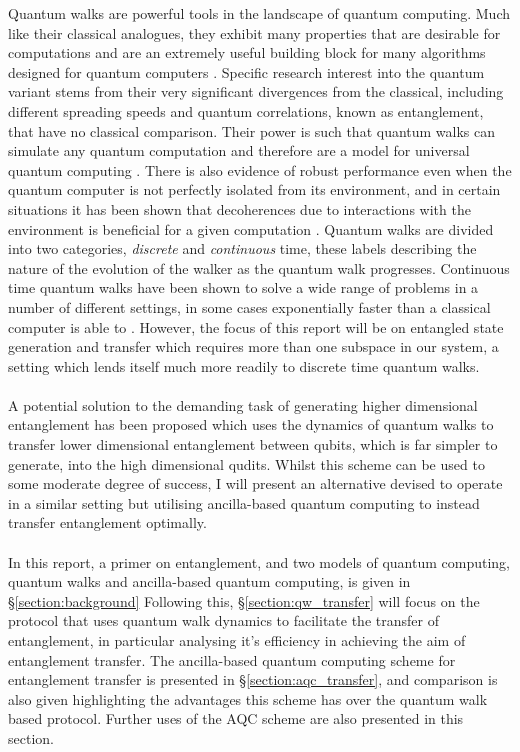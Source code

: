 Quantum walks are powerful tools in the landscape of quantum computing. 
Much like their classical analogues, they exhibit many properties that are desirable for computations and are an extremely useful building block for many algorithms designed for quantum computers \cite{shenvi2003}. 
Specific research interest into the quantum variant stems from their very significant divergences from the classical, including different spreading speeds and quantum correlations, known as entanglement, that have no classical comparison. 
Their power is such that quantum walks can simulate any quantum computation and therefore are a model for universal quantum computing \cite{Childs_2009}.
There is also evidence of robust performance even when the quantum computer is not perfectly isolated from its environment, and in certain situations it has been shown that decoherences due to interactions with the environment is beneficial for a given computation \cite{KENDON_2007}. 
Quantum walks are divided into two categories, \emph{discrete} and \emph{continuous} time, these labels describing the nature of the evolution of the walker as the quantum walk progresses.
Continuous time quantum walks have been shown to solve a wide range of problems in a number of different settings, in some cases exponentially faster than a classical computer is able to \cite{Childs_2003}. 
However, the focus of this report will be on entangled state generation and transfer which requires more than one subspace in our system, a setting which lends itself much more readily to discrete time quantum walks.\paragraph{}

A potential solution to the demanding task of generating higher dimensional entanglement has been proposed \cite{giordani2020} which uses the dynamics of quantum walks to transfer lower dimensional entanglement between qubits, which is far simpler to generate, into the high dimensional qudits. 
Whilst this scheme can be used to some moderate degree of success, I will present an alternative devised to operate in a similar setting but utilising ancilla-based quantum computing to instead transfer entanglement optimally.\paragraph{}

In this report, a primer on entanglement, and two models of quantum computing, quantum walks and ancilla-based quantum computing, is given in \S{\ref{section:background}}
Following this, \S{\ref{section:qw_transfer}} will focus on the protocol that uses quantum walk dynamics to facilitate the transfer of entanglement, in particular analysing it's efficiency in achieving the aim of entanglement transfer. The ancilla-based quantum computing scheme for entanglement transfer is presented in \S{\ref{section:aqc_transfer}}, and comparison is also given highlighting the advantages this scheme has over the quantum walk based protocol. Further uses of the AQC scheme are also presented in this section.

